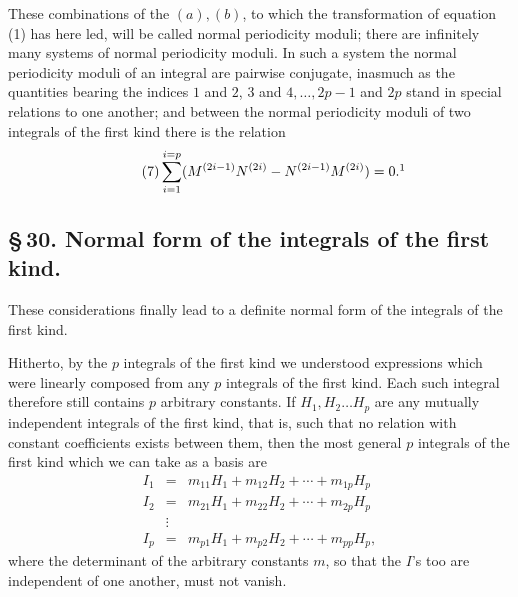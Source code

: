 \documentclass[10pt]{article}
\begin{document}
These combinations of the \((a),(b)\), to which the transformation of equation (1) has here led, will be called normal periodicity moduli; there are infinitely many systems of normal periodicity moduli. In such a system the normal periodicity moduli of an integral are pairwise conjugate, inasmuch as the quantities bearing the indices \(1\) and \(2\), \(3\) and \(4,\ldots,2p-1\) and \(2p\) stand in special relations to one another; and between the normal periodicity moduli of two integrals of the first kind there is the relation
\[
\tag{7}\sum_{i=1}^{i=p}(M^{(2i-1)}N^{(2i)}-N^{(2i-1)}M^{(2i)})=0.\footnotemark
\]

\subsection*{\S\,30. Normal form of the integrals of the first kind.}

These considerations finally lead to a definite normal form of the integrals of the first kind.

Hitherto, by the \(p\) integrals of the first kind we understood expressions which were linearly composed from any \(p\) integrals of the first kind. Each such integral therefore still contains \(p\) arbitrary constants. If \(H_1,H_2\ldots H_p\) are any mutually independent integrals of the first kind, that is, such that no relation with constant coefficients exists between them, then the most general \(p\) integrals of the first kind which we can take as a basis are
\[
\begin{array}{rcl}
I_1&=&m_{11}H_1+m_{12}H_2+\cdots+m_{1p}H_p\\
I_2&=&m_{21}H_1+m_{22}H_2+\cdots+m_{2p}H_p\\
&\vdots&\\
I_p&=&m_{p1}H_1+m_{p2}H_2+\cdots+m_{pp}H_p,
\end{array}
\]
where the determinant of the arbitrary constants \(m\), so that the \(I\)'s too are independent of one another, must not vanish.
\end{document}
